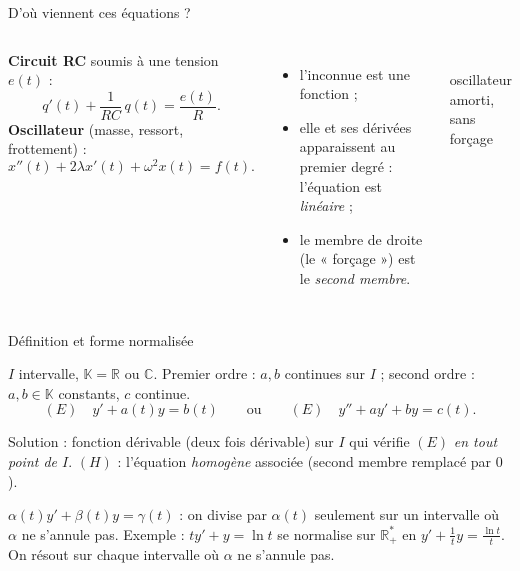 \documentclass[aspectratio=169,10pt]{beamer}
\newcommand{\K}{\mathbb{K}}\newcommand{\R}{\mathbb{R}}\newcommand{\C}{\mathbb{C}}\newcommand{\Z}{\mathbb{Z}}
\newif\ifPT \ifdefined\VERSIONPT \PTtrue \else \PTfalse \fi
\begin{document}
\begin{frame}{D'où viennent ces équations ?}
\begin{columns}[T]
\textbf{Circuit RC} soumis à une tension $e(t)$ :
\[q'(t)+\frac1{RC}\,q(t)=\frac{e(t)}R.\]
\textbf{Oscillateur} (masse, ressort, frottement) :
\[x''(t)+2\lambda x'(t)+\omega^2x(t)=f(t).\]
\pause
\begin{itemize}
\item l'inconnue est une \alert{fonction} ;
\item elle et ses dérivées apparaissent \alert{au premier degré} : l'équation est \emph{linéaire} ;
\item le membre de droite (le « forçage ») est le \emph{second membre}.
\end{itemize}
\centering
{}\\
{\footnotesize\color{Gris}oscillateur amorti, sans forçage}
\end{columns}
\end{frame}

\begin{frame}{Définition et forme normalisée}
\begin{DEF}
\ifPT
$I$ intervalle, $a,b,c$ \alert{continues} sur $I$ à valeurs dans $\K=\R$ ou $\C$.
\[(E)\quad y'+a(t)y=b(t)\qquad\text{ou}\qquad(E)\quad y''+a(t)y'+b(t)y=c(t).\]
\else
$I$ intervalle, $\K=\R$ ou $\C$. Premier ordre : $a,b$ \alert{continues} sur $I$ ; second ordre : $a,b\in\K$ \alert{constants}, $c$ continue.
\[(E)\quad y'+a(t)y=b(t)\qquad\text{ou}\qquad(E)\quad y''+ay'+by=c(t).\]
\fi
Solution : fonction dérivable (deux fois dérivable) sur $I$ qui vérifie $(E)$ \emph{en tout point de $I$}.
$(H)$ : l'équation \emph{homogène} associée (second membre remplacé par $0$).
\end{DEF}
\pause
\begin{PIEGE}
\ifPT$\alpha(t)y''+\beta(t)y'+\gamma(t)y=\delta(t)$\else$\alpha(t)y'+\beta(t)y=\gamma(t)$\fi{} : on divise par $\alpha(t)$ \alert{seulement sur un intervalle où $\alpha$ ne s'annule
pas}. Exemple : $ty'+y=\ln t$ se normalise sur $\R_+^*$ en $y'+\frac1ty=\frac{\ln t}t$. \ifPT Les points où $\alpha$ s'annule : §1.2, recollement.\else On résout sur chaque intervalle où $\alpha$ ne s'annule pas.\fi
\end{PIEGE}
\end{frame}
\end{document}
